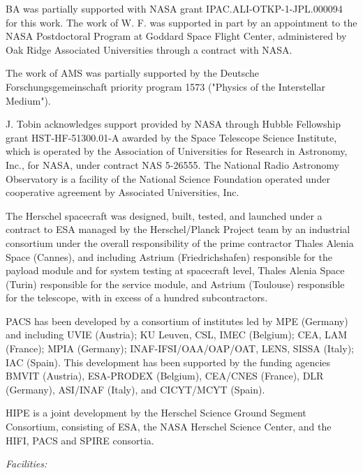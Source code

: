 \documentclass[manuscript]{aastex}
\begin{document}
\acknowledgments
\par
BA was partially supported with NASA grant IPAC.ALI-OTKP-1-JPL.000094 for this work.  The work of W. F. was supported in part by an appointment to the NASA Postdoctoral Program at Goddard Space Flight Center, administered by Oak Ridge Associated Universities through a contract with NASA.
\par
The work of AMS was partially supported by the Deutsche Forschungsgemeinschaft priority program 1573 ("Physics of the Interstellar Medium").
\par
J. Tobin acknowledges support provided by NASA through Hubble Fellowship grant HST-HF-51300.01-A awarded by the Space Telescope Science Institute, which is operated by the Association of Universities for Research in Astronomy, Inc., for NASA, under contract NAS 5-26555. The National Radio Astronomy Observatory is a facility of the National Science Foundation operated under cooperative agreement by Associated Universities, Inc.
\par
The Herschel spacecraft was designed, built, tested, and launched under a contract to ESA managed by the Herschel/Planck Project team by an industrial consortium under the overall responsibility of the prime contractor Thales Alenia Space (Cannes), and including Astrium (Friedrichshafen) responsible for the payload module and for system testing at spacecraft level, Thales Alenia Space (Turin) responsible for the service module, and Astrium (Toulouse) responsible for the telescope, with in excess of a hundred subcontractors.
\par
PACS has been developed by a consortium of institutes led by MPE (Germany) and including UVIE (Austria); KU Leuven, CSL, IMEC (Belgium); CEA, LAM (France); MPIA (Germany); INAF-IFSI/OAA/OAP/OAT, LENS, SISSA (Italy); IAC (Spain). This development has been supported by the funding agencies BMVIT (Austria), ESA-PRODEX (Belgium), CEA/CNES (France), DLR (Germany), ASI/INAF (Italy), and CICYT/MCYT (Spain).
\par
HIPE is a joint development by the Herschel Science Ground Segment Consortium, consisting of ESA, the NASA Herschel Science Center, and the HIFI, PACS and SPIRE consortia.

{\it Facilities:} 

\clearpage
\end{document}
